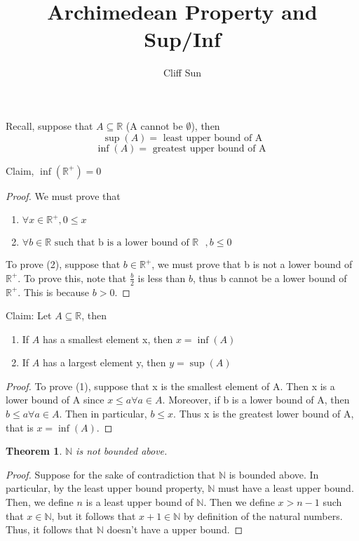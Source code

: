 \documentclass{article}
\title{Archimedean Property and Sup/Inf}
\author{Cliff Sun}
\newtheorem{theorem}{Theorem}[section]
\begin{document}
\maketitle

Recall, suppose that $A \subseteq \mathbb{R}$ (A cannot be $\emptyset$), then 
\begin{equation}
    \sup(A) = \textrm{ least upper bound of A}
\end{equation}
\begin{equation}
    \inf(A) = \textrm{ greatest upper bound of A }
\end{equation}

Claim, $\inf(\mathbb{R}^+) = 0$

\begin{proof}
    We must prove that 
    \begin{enumerate}
        \item $\forall x \in \mathbb{R}^+, 0 \leq x$
        \item $\forall b \in \mathbb{R} \textrm{ such that b is a lower bound of $\mathbb{R}$ }, b \leq 0$
    \end{enumerate}
    To prove (2), suppose that $b \in \mathbb{R}^+$, we must prove that b is not a lower bound of $\mathbb{R}^+$. To prove this, note that $\frac{b}{2}$ is less than $b$, thus b cannot
    be a lower bound of $\mathbb{R}^+$. This is because $b > 0$.
\end{proof}

Claim: Let $A \subseteq \mathbb{R}$, then
\begin{enumerate}
    \item If $A$ has a smallest element x, then $x = \inf(A)$
    \item If $A$ has a largest element y, then $y = \sup(A)$
\end{enumerate}

\begin{proof}
    To prove (1), suppose that x is the smallest element of A. Then x is a lower bound of A since $x \leq a \forall a \in A$. Moreover, if
    b is a lower bound of A, then $b \leq a \forall a \in A$. Then in particular, $b \leq x$. Thus x is the greatest lower bound of A, that is $x = \inf(A)$. 
\end{proof}

\begin{theorem}
    $\mathbb{N}$ is not bounded above. 
\end{theorem}

\begin{proof}
    Suppose for the sake of contradiction that $\mathbb{N}$ is bounded above. In particular, by the least upper bound property, $\mathbb{N}$ must have a least upper bound. Then, we define $n$ is a least upper bound of $\mathbb{N}$. 
    Then we define $x > n - 1$ such that $x \in \mathbb{N}$, but it follows that $x + 1 \in \mathbb{N}$ by definition of the natural numbers. Thus, it follows that $\mathbb{N}$ doesn't have a upper bound. 
\end{proof}
\end{document}
